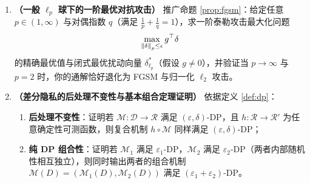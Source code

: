\begin{enumerate}[label=\textbf{7.3.\arabic*}, start=3]
  \item \textbf{（一般 $\ell_p$ 球下的一阶最优对抗攻击）} 推广命题 \ref{prop:fgsm}：给定任意 $p \in (1, \infty)$ 与对偶指数 $q$（满足 $\frac{1}{p} + \frac{1}{q} = 1$），求一阶泰勒攻击最大化问题
  \[
    \max_{\left\|\delta\right\|_p \le \epsilon} g^\top \delta
  \]
  的精确最优值与闭式最优扰动向量 $\delta^*_{\ell_p}$（假设 $g \neq 0$），并验证当 $p \to \infty$ 与 $p = 2$ 时，你的通解恰好退化为 FGSM 与归一化 $\ell_2$ 攻击。

  \item \textbf{（差分隐私的后处理不变性与基本组合定理证明）} 依据定义 \ref{def:dp}：
  \begin{enumerate}
    \item \textbf{后处理不变性}：证明若 $\mathcal{M}: \mathcal{D} \to \mathcal{R}$ 满足 $(\varepsilon, \delta)$-DP，且 $h: \mathcal{R} \to \mathcal{R}'$ 为任意确定性可测函数，则复合机制 $h \circ \mathcal{M}$ 同样满足 $(\varepsilon, \delta)$-DP；
    \item \textbf{纯 DP 组合性}：证明若 $\mathcal{M}_1$ 满足 $\varepsilon_1$-DP，$\mathcal{M}_2$ 满足 $\varepsilon_2$-DP（两者内部随机性相互独立），则同时输出两者的组合机制 $\mathcal{M}(D) = (\mathcal{M}_1(D), \mathcal{M}_2(D))$ 满足 $(\varepsilon_1 + \varepsilon_2)$-DP。
  \end{enumerate}
\end{enumerate}


